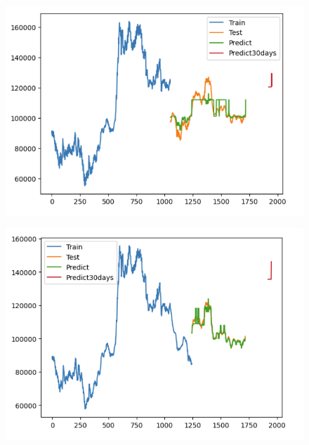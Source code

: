 \documentclass{article}
\begin{document}
\begin{multicols}{2}
\begin{figure}[H]
    \centering
    \begin{minipage}{0.15\textwidth}
    \centering
    \includegraphics[width=1\textwidth]{Image/Light GBM/LG_6_4_30.png}
   
    \label{fig:1}
    \end{minipage}%
    \begin{minipage}{0.15\textwidth}
    \centering
    \includegraphics[width=1\textwidth]{Image/Light GBM/LG_7_3_30.png}
  

\end{minipage}
\end{figure}
\end{multicols}
\end{document}
